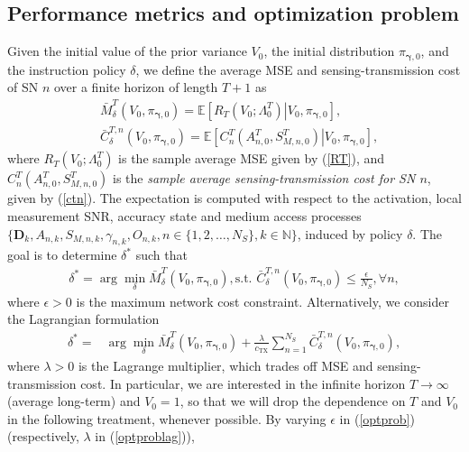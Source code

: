 \documentclass[10pt,twocolumn,twoside]{IEEEtran}
\theoremstyle{plain}
\begin{document}
\subsection{Performance metrics and optimization problem}
\label{sec:optprob}
\noindent Given the initial value of the prior variance $V_0$, the initial distribution $\pi_{\boldsymbol\gamma,0}$, and the instruction policy $\delta$,
we define the average MSE and sensing-transmission cost of SN $n$  over a finite horizon of length $T+1$
as \begin{align}
\label{Cest}
&\bar M_{\delta}^{T}(V_0,\pi_{\boldsymbol\gamma,0})=\mathbb E\left[\left.R_T(V_0;\Lambda_0^T)\right|
V_0,\pi_{\boldsymbol\gamma,0}\right],
\\\label{CSN}
& {\bar C_{\delta}^{T,n}(V_0,\pi_{\boldsymbol\gamma,0})=\mathbb E\left[\left.
C_n^{T}(A_{n,0}^T,S_{M,n,0}^T)
\right|V_0,\pi_{\boldsymbol\gamma,0}\right],}
\end{align}
{
where $R_T(V_0;\Lambda_0^T)$ is the sample average MSE given by (\ref{RT}),
and $C_n^{T}(A_{n,0}^T,S_{M,n,0}^T)$
is the \emph{sample average sensing-transmission cost for SN $n$}, given by (\ref{ctn})}.
The expectation is computed with respect to the activation, local measurement SNR, accuracy state and medium access processes 
$\{\mathbf D_k,A_{n,k},S_{M,n,k},\gamma_{n,k},O_{n,k},n\in\{1,2,\dots,N_S\},k\in\mathbb N\}$, induced by policy $\delta$.
The goal is to determine $\delta^*$ such that
\begin{align}
\label{optprob}
\!\!\!\!\delta^*\!\!=\!\arg\min_{\delta} \bar M_{\delta}^{T}(V_0,\pi_{\boldsymbol\gamma,0}),
\text{s.t. }\bar C_{\delta}^{T,n}(V_0,\pi_{\boldsymbol\gamma,0})\!\leq\!\frac{\epsilon}{N_S},\forall n,\!\!
\end{align}
where $\epsilon{>}0$ is the maximum network cost constraint.
Alternatively,
we consider the Lagrangian formulation
\begin{align}
\label{optproblag}
\!\!\!\!\delta^*=&\arg\min_{\delta} \bar M_{\delta}^{T}(V_0,\pi_{\boldsymbol\gamma,0})
+\frac{\lambda}{c_{\mathrm{TX}}}\sum_{n=1}^{N_S}\bar C_{\delta}^{T,n}(V_0,\pi_{\boldsymbol\gamma,0}),
\end{align}
where $\lambda>0$ is the Lagrange multiplier, which trades off MSE and sensing-transmission cost.
 In particular, we are interested in the infinite horizon $T{\to}\infty$  (average long-term)
 and $V_0{=}1$,
 so that we will drop the dependence  on $T$ and $V_0$ in the following treatment, whenever possible.
 By varying $\epsilon$ in (\ref{optprob}) (respectively, $\lambda$ in (\ref{optproblag})),
\end{document}

